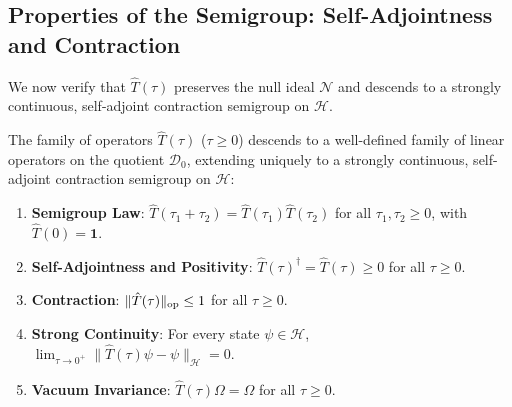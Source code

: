 \subsection{Properties of the Semigroup: Self-Adjointness and Contraction}
\label{subsec:semigroup_properties_proofs}

We now verify that $\hat{T}(\tau)$ preserves the null ideal $\mathcal{N}$ and descends to a strongly continuous, self-adjoint contraction semigroup on $\mathcal{H}$.

\begin{proposition}
\label{prop:semigroup_properties}
The family of operators $\hat{T}(\tau)$ ($\tau \ge 0$) descends to a well-defined family of linear operators on the quotient $\mathcal{D}_0$, extending uniquely to a strongly continuous, self-adjoint contraction semigroup on $\mathcal{H}$:
\begin{enumerate}
    \item \textbf{Semigroup Law}: $\hat{T}(\tau_1 + \tau_2) = \hat{T}(\tau_1) \hat{T}(\tau_2)$ for all $\tau_1, \tau_2 \ge 0$, with $\hat{T}(0) = \mathbf{1}$.
    \item \textbf{Self-Adjointness and Positivity}: $\hat{T}(\tau)^\dagger = \hat{T}(\tau) \ge 0$ for all $\tau \ge 0$.
    \item \textbf{Contraction}: $\|\hat{T}(\tau)\|_{\mathrm{op}} \le 1$ for all $\tau \ge 0$.
    \item \textbf{Strong Continuity}: For every state $\psi \in \mathcal{H}$, $\lim_{\tau \to 0^+} \|\hat{T}(\tau) \psi - \psi\|_{\mathcal{H}} = 0$.
    \item \textbf{Vacuum Invariance}: $\hat{T}(\tau) \Omega = \Omega$ for all $\tau \ge 0$.
\end{enumerate}
\end{proposition}

